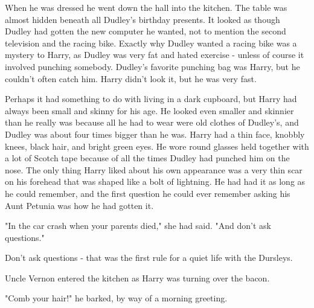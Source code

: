 When he was dressed he went down the hall into the kitchen. The table was almost hidden beneath all Dudley's birthday presents. It looked as though Dudley had gotten the new computer he wanted, not to mention the second television and the racing bike. Exactly why Dudley wanted a racing bike was a mystery to Harry, as Dudley was very fat and hated exercise - unless of course it involved punching somebody. Dudley's favorite punching bag was Harry, but he couldn't often catch him. Harry didn't look it, but he was very fast. 

Perhaps it had something to do with living in a dark cupboard, but Harry had always been small and skinny for his age. He looked even smaller and skinnier than he really was because all he had to wear were old clothes of Dudley's, and Dudley was about four times bigger than he was. Harry had a thin face, knobbly knees, black hair, and bright green eyes. He wore round glasses held together with a lot of Scotch tape because of all the times Dudley had punched him on the nose. The only thing Harry liked about his own appearance was a very thin scar on his forehead that was shaped like a bolt of lightning. He had had it as long as he could remember, and the first question he could ever remember asking his Aunt Petunia was how he had gotten it. 

"In the car crash when your parents died," she had said. "And don't ask questions." 

Don't ask questions - that was the first rule for a quiet life with the Dursleys. 

Uncle Vernon entered the kitchen as Harry was turning over the bacon. 

"Comb your hair!" he barked, by way of a morning greeting.